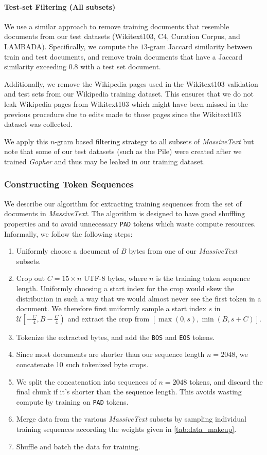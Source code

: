\documentclass[11pt, a4paper, logo, internal, copyright, nonumbering]{deepmind}
\newcommand{\massivetext}{\textit{MassiveText}\xspace}
\newcommand{\gopher}{\textit{Gopher}\xspace}
\begin{document}
\paragraph{Test-set Filtering (All subsets)}
\label{app:test_set_filtering}
We use a similar approach to remove training documents that resemble documents from our test datasets (Wikitext103, C4, Curation Corpus, and LAMBADA). Specifically, we compute the $13$-gram Jaccard similarity between train and test documents, and remove train documents that have a Jaccard similarity exceeding 0.8 with a test set document.

Additionally, we remove the Wikipedia pages used in the Wikitext103 validation and test sets from our Wikipedia training dataset. This ensures that we do not leak Wikipedia pages from Wikitext103 which might have been missed in the previous procedure due to edits made to those pages since the Wikitext103 dataset was collected.

We apply this $n$-gram based filtering strategy to all subsets of \massivetext but note that some of our test datasets (such as the Pile) were created after we trained \gopher and thus may be leaked in our training dataset.

\subsubsection{Constructing Token Sequences}
We describe our algorithm for extracting training sequences from the set of documents in \massivetext. The algorithm is designed to have good shuffling properties and to avoid unnecessary \texttt{PAD} tokens which waste compute resources. Informally, we follow the following steps:


\begin{enumerate}
    \item Uniformly choose a document of $B$ bytes from one of our \massivetext subsets.
    \item Crop out $C{=}15 \times n$ UTF-8 bytes, where $n$ is the training token sequence length. Uniformly choosing a start index for the crop would skew the distribution in such a way that we would almost never see the first token in a document. We therefore first uniformly sample a start index $s$ in $\mathcal{U}\left[ -\frac{C}{4}, B - \frac{C}{4} \right)$ and extract the crop from $[\max(0, s), \min(B, s+C)]$.
    \item Tokenize the extracted bytes, and add the \texttt{BOS} and \texttt{EOS} tokens.
    \item Since most documents are shorter than our sequence length $n{=}2048$, we concatenate 10 such tokenized byte crops.
    \item We split the concatenation into sequences of $n{=}2048$ tokens, and discard the final chunk if it's shorter than the sequence length. This avoids wasting compute by training on \texttt{PAD} tokens.
    \item Merge data from the various \massivetext subsets by sampling individual training sequences according the weights given in \autoref{tab:data_makeup}.
    \item Shuffle and batch the data for training.
\end{enumerate}
\end{document}
